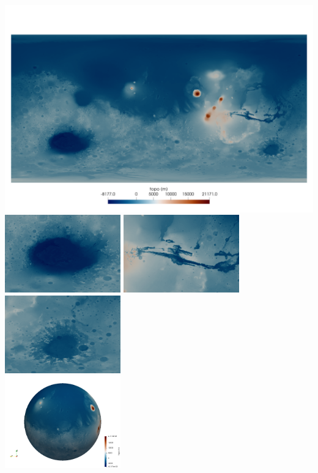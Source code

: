 \begin{center}
\includegraphics[width=15cm]{python_codes/fieldstone_100/images/topo2D_a}\\
\includegraphics[width=5cm]{python_codes/fieldstone_100/images/topo2D_b}
\includegraphics[width=5cm]{python_codes/fieldstone_100/images/topo2D_c}
\includegraphics[width=5cm]{python_codes/fieldstone_100/images/topo2D_d}\\
\includegraphics[width=5cm]{python_codes/fieldstone_100/images/topo3D_1}

\end{center}
